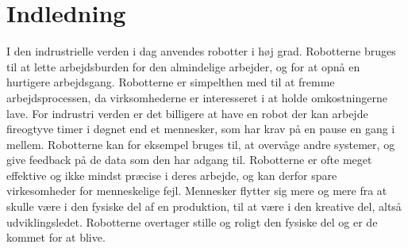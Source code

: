 \chapter{Indledning}\label{chap:Indledning}
I den indrustrielle verden i dag anvendes robotter i høj grad. Robotterne bruges til at lette arbejdsburden for den almindelige arbejder, og for at opnå en hurtigere arbejdsgang. Robotterne er simpelthen med til at fremme arbejdsprocessen, da virksomhederne er interesseret i at holde omkostningerne lave. For indrustri verden er det billigere at have en robot der kan arbejde fireogtyve timer i døgnet end et mennesker, som har krav på en pause en gang i mellem. Robotterne kan for eksempel bruges til, at overvåge andre systemer, og give feedback på de data som den har adgang til. Robotterne er ofte meget effektive og ikke mindst præcise i deres arbejde, og kan derfor spare virkesomheder for menneskelige fejl. Mennesker flytter sig mere og mere fra at skulle være i den fysiske del af en produktion, til at være i den kreative del, altså udviklingsledet. Robotterne overtager stille og roligt den fysiske del og er de kommet for at blive.